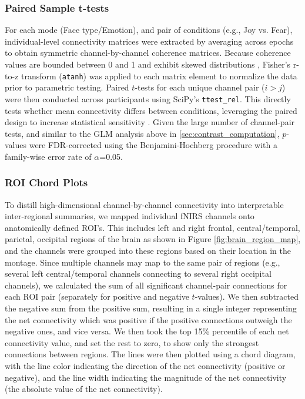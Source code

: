\subsubsection{Paired Sample t-tests}
For each mode (Face type/Emotion), and pair of conditions (e.g., Joy vs. Fear), individual-level connectivity matrices were extracted by averaging across epochs to obtain symmetric channel-by-channel coherence matrices. 
Because coherence values are bounded between 0 and 1 and exhibit skewed distributions \citep{miranda_de_sa_coherence_2009}, Fisher's r-to-z transform (\texttt{atanh}) was applied to each matrix element to normalize the data prior to parametric testing. 
Paired $t$-tests for each unique channel pair ($i > j$) were then conducted across participants using SciPy's \texttt{ttest\_rel}.
This directly tests whether mean connectivity differs between conditions, leveraging the paired design to increase statistical sensitivity \citep{hu_characterizing_2023}. 
Given the large number of channel-pair tests, and similar to the GLM analysis above in \ref{sec:contrast_computation}, $p$-values were FDR-corrected using the Benjamini-Hochberg procedure \citep{singh_exploring_2006} with a family-wise error rate of $\alpha$=0.05.

\subsubsection{ROI Chord Plots}
To distill high-dimensional channel-by-channel connectivity into interpretable inter-regional summaries, we mapped individual fNIRS channels onto anatomically defined ROI's. 
This includes left and right frontal, central/temporal, parietal, occipital regions of the brain as shown in Figure \ref{fig:brain_region_map}, and the channels were grouped into these regions based on their location in the montage.
Since multiple channels may map to the same pair of regions (e.g., several left central/temporal channels connecting to several right occipital channels), we calculated the sum of all significant channel-pair connections for each ROI pair (separately for positive and negative $t$-values). 
We then subtracted the negative sum from the positive sum, resulting in a single integer representing the net connectivity which was positive if the positive connections outweigh the negative ones, and vice versa.
We then took the top 15\% percentile of each net connectivity value, and set the rest to zero, to show only the strongest connections between regions.
The lines were then plotted using a chord diagram, with the line color indicating the direction of the net connectivity (positive or negative), and the line width indicating the magnitude of the net connectivity (the absolute value of the net connectivity).

